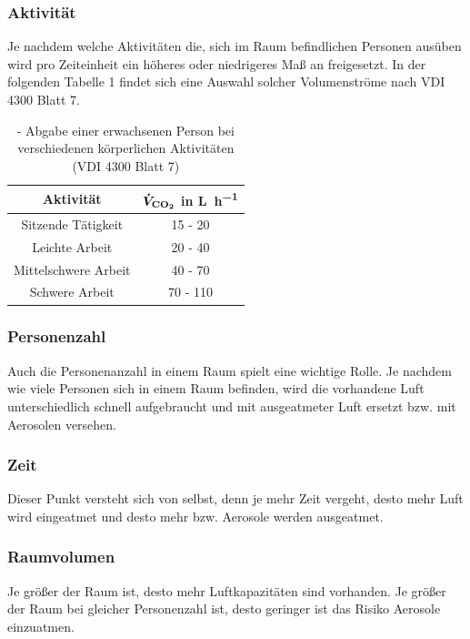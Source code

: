 \subsubsection*{Aktivität}
Je nachdem welche Aktivitäten die, sich im Raum befindlichen Personen ausüben wird pro Zeiteinheit ein höheres oder niedrigeres Maß an  freigesetzt. In der folgenden Tabelle 1 findet sich eine Auswahl solcher Volumenströme nach VDI 4300 Blatt 7.

\begin{table}[h!]
	\renewcommand*{\arraystretch}{1.2}
	\centering
	\caption{- Abgabe einer erwachsenen Person bei verschiedenen körperlichen Aktivitäten (VDI 4300 Blatt 7)}
	\label{tab:aktivitaeten}
		\begin{tabulary}{1.0\textwidth}{C|C}
			\hline
			\textbf{Aktivität} 	& \textbf{$\boldmath \dot{V}_{\ce{CO2}}$ in \si{\liter \per \hour}}\\
			\hline
			Sitzende Tätigkeit 	& 15 - 20 \\
			Leichte Arbeit			& 20 - 40 \\
			Mittelschwere Arbeit & 40 - 70 \\
			Schwere Arbeit 	& 70 - 110\\
			\hline			
		\end{tabulary}
\end{table}
\FloatBarrier
\vspace*{-5mm}
\subsubsection*{Personenzahl}
Auch die Personenanzahl in einem Raum spielt eine wichtige Rolle. Je nachdem wie viele Personen sich in einem Raum befinden, wird die vorhandene Luft unterschiedlich schnell aufgebraucht und mit ausgeatmeter Luft ersetzt bzw. mit Aerosolen versehen.

\subsubsection*{Zeit}
Dieser Punkt versteht sich von selbst, denn je mehr Zeit vergeht, desto mehr Luft wird eingeatmet und desto mehr  bzw. Aerosole werden ausgeatmet.

\subsubsection*{Raumvolumen}
Je größer der Raum ist, desto mehr Luftkapazitäten sind vorhanden. Je größer der Raum bei gleicher Personenzahl ist, desto geringer ist das Risiko Aerosole einzuatmen.

